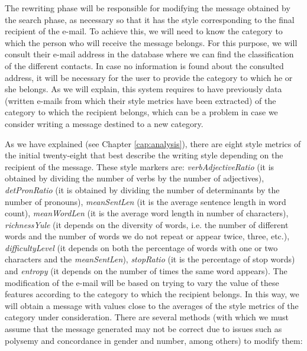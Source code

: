 The rewriting phase will be responsible for modifying the message obtained by the search phase, as necessary so that it has the style corresponding to the final recipient of the e-mail. To achieve this, we will need to know the category to which the person who will receive the message belongs. For this purpose, we will consult their e-mail address in the database where we can find the classification of the different contacts. In case no information is found about the consulted address, it will be necessary for the user to provide the category to which he or she belongs. As we will explain, this system requires to have previously data (written e-mails from which their style metrics have been extracted) of the category to which the recipient belongs, which can be a problem in case we consider writing a message destined to a new category.

As we have explained (see Chapter \ref{cap:analysis}), there are eight style metrics of the initial twenty-eight that best describe the writing style depending on the recipient of the message. These style markers are: \textit{verbAdjectiveRatio} (it is obtained by dividing the number of verbs by the number of adjectives), \textit{detPronRatio} (it is obtained by dividing the number of determinants by the number of pronouns), \textit{meanSentLen} (it is the average sentence length in word count), \textit{meanWordLen} (it is the average word length in number of characters), \textit{richnessYule} (it depends on the diversity of words, i.e. the number of different words and the number of words we do not repeat or appear twice, three, etc.), \textit{difficultyLevel} (it depends on both the percentage of words with one or two characters and the \textit{meanSentLen}), \textit{stopRatio} (it is the percentage of stop words) and \textit{entropy} (it depends on the number of times the same word appears). The modification of the e-mail will be based on trying to vary the value of these features according to the category to which the recipient belongs. In this way, we will obtain a message with values close to the averages of the style metrics of the category under consideration. There are several methods (with which we must assume that the message generated may not be correct due to issues such as polysemy and concordance in gender and number, among others) to modify them:

